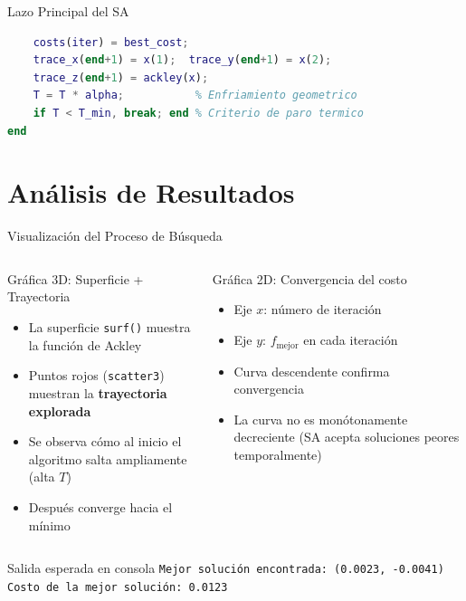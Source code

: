 \documentclass[aspectratio=169,xcolor=dvipsnames]{beamer}
\begin{document}
\begin{frame}[fragile]{Lazo Principal del SA}
\begin{lstlisting}[language=Matlab, style=MATLABStyle]
    % 3. Registrar trayectoria y actualizar temperatura
    costs(iter) = best_cost;
    trace_x(end+1) = x(1);  trace_y(end+1) = x(2);
    trace_z(end+1) = ackley(x);
    T = T * alpha;           % Enfriamiento geometrico
    if T < T_min, break; end % Criterio de paro termico
end
\end{lstlisting}
\end{frame}
\section{Análisis de Resultados}

\begin{frame}{Visualización del Proceso de Búsqueda}
    \footnotesize
    \begin{columns}
        \begin{block}{Gráfica 3D: Superficie + Trayectoria}
            \begin{itemize}
                \item La superficie \texttt{surf()} muestra la función de Ackley
                \item Puntos rojos (\texttt{scatter3}) muestran la \textbf{trayectoria explorada}
                \item Se observa cómo al inicio el algoritmo salta ampliamente (alta $T$)
                \item Después converge hacia el mínimo
            \end{itemize}
        \end{block}
        \begin{block}{Gráfica 2D: Convergencia del costo}
            \begin{itemize}
                \item Eje $x$: número de iteración
                \item Eje $y$: $f_{\text{mejor}}$ en cada iteración
                \item Curva descendente confirma convergencia
                \item La curva no es monótonamente decreciente (SA acepta soluciones peores temporalmente)
            \end{itemize}
        \end{block}
    \end{columns}
    \vspace{0.2cm}
    \begin{exampleblock}{Salida esperada en consola}
        \texttt{Mejor solución encontrada: (0.0023, -0.0041)} \\
        \texttt{Costo de la mejor solución: 0.0123}
    \end{exampleblock}
\end{frame}
\end{document}
